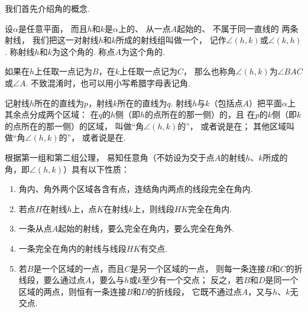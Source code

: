 我们首先介绍角的概念.
\begin{definition}\label{definition:欧氏几何.几何元素.角}
设\(\alpha\)是任意平面，
而且\(h\)和\(k\)是\(\alpha\)上的、%
从一点\(A\)起始的、%
不属于同一直线的%
两条射线，
我们把这一对射线\(h\)和\(k\)所成的射线组叫做一个，
记作\(\angle(h,k)\)或\(\angle(k,h)\).
称射线\(h\)和\(k\)为这个角的.
称点\(A\)为这个角的.

如果在\(h\)上任取一点记为\(B\)，在\(k\)上任取一点记为\(C\)，
那么也称角\(\angle(h,k)\)为\(\angle BAC\)或\(\angle A\).
不致混淆时，也可以用小写希腊字母表记角.

记射线\(h\)所在的直线为\(p\)，射线\(k\)所在的直线为\(q\).
射线\(h\)与\(k\)（包括点\(A\)）把平面\(\alpha\)上其余点分成两个区域：
在\(q\)的\(h\)侧（即\(h\)的点所在的那一侧）的，且%
在\(p\)的\(k\)侧（即\(k\)的点所在的那一侧）的区域，
叫做“角\(\angle(h,k)\)的”，
或者说是在；
其他区域叫做“角\(\angle(h,k)\)的”，
或者说是在.
\end{definition}

\begin{property}
根据第一组和第二组公理，
易知任意角（不妨设为交于点\(A\)的射线\(h\)、\(k\)所成的角，即\(\angle(h,k)\)）具有以下性质：
\begin{enumerate}
\item 角内、角外两个区域各含有点，连结角内两点的线段完全在角内.
\item 若点\(H\)在射线\(h\)上，点\(K\)在射线\(k\)上，则线段\(HK\)完全在角内.
\item 一条从点\(A\)起始的射线，要么完全在角内，要么完全在角外.
\item 一条完全在角内的射线与线段\(HK\)有交点.
\item 若\(B\)是一个区域的一点，而且\(C\)是另一个区域的一点，
则每一条连接\(B\)和\(C\)的折线段，要么通过点\(A\)，要么与\(h\)或\(k\)至少有一个交点；
反之，若\(B\)和\(D\)是同一个区域的两点，则恒有一条连接\(B\)和\(D\)的折线段，
它既不通过点\(A\)，又与\(h\)、\(k\)无交点.
\end{enumerate}
\end{property}


